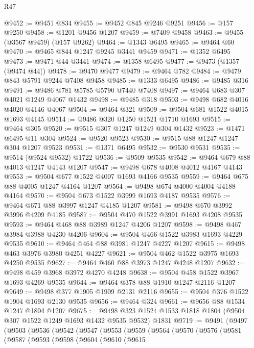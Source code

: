 \begin{lexlean}{R47}
\begin{coremodule}
@9452 := @9451 @834
@9455 := @9452 @845 @9246 @9251
@9456 := @157 @9250
@9458 := @1201 @9456 @1207
@9459 := @7409 @9458
@9463 := @9455 (@3567 @9459) (@157 @9262)
@9464 := @1343 @6495
@9465 := @9464 @60
@9470 := @9465 @844 @1247 @9245 @3441 @9459
@9471 := @1352 @6495
@9473 := @9471 @44 @3441
@9474 := @1358 @6495
@9477 := @9473 (@1357 (@9474 @44))
@9478 := @9470 @9477
@9479 := @9464 @782
@9484 := @9479 @843 @5791 @9244 @7408 @9458
@9485 := @1333 @6495
@9486 := @9485 @316
@9491 := @9486 @781 @5785 @5790 @7440 @7408
@9497 := @9464 @683 @307 @4021 @1249 @4067 @1432
@9498 := @9485 @318
@9503 := @9498 @682 @4016 @4020 @4146 @4067
@9504 := @9464 @321
@9509 := @9504 @681 @1522 @4015 @1693 @4145
@9514 := @9486 @320 @1250 @1521 @1710 @1693
@9515 := @9464 @305
@9520 := @9515 @307 @1247 @1249 @304 @1432
@9523 := @1471 @6495 @11 @304
@9524 := @9520 @9523
@9530 := @9515 @88 @1247 @1247 @304 @1207 @9523
@9531 := @1371 @6495
@9532 := @9530 @9531
@9535 := @9514 (@9524 @9532) @1722
@9536 := @9509 @9535
@9542 := @9464 @679 @88 @4013 @1247 @4143 @1207
@9547 := @9498 @678 @4008 @4012 @4167 @4143
@9553 := @9504 @677 @1522 @4007 @1693 @4166 @9535
@9559 := @9464 @675 @88 @4005 @1247 @4164 @1207
@9564 := @9498 @674 @4000 @4004 @4188 @4164
@9570 := @9504 @673 @1522 @3999 @1693 @4187 @9535
@9576 := @9464 @671 @88 @3997 @1247 @4185 @1207
@9581 := @9498 @670 @3992 @3996 @4209 @4185
@9587 := @9504 @470 @1522 @3991 @1693 @4208 @9535
@9593 := @9464 @468 @88 @3989 @1247 @4206 @1207
@9598 := @9498 @467 @3984 @3988 @4230 @4206
@9604 := @9504 @466 @1522 @3983 @1693 @4229 @9535
@9610 := @9464 @464 @88 @3981 @1247 @4227 @1207
@9615 := @9498 @463 @3976 @3980 @4251 @4227
@9621 := @9504 @462 @1522 @3975 @1693 @4250 @9535
@9627 := @9464 @460 @88 @3973 @1247 @4248 @1207
@9632 := @9498 @459 @3968 @3972 @4270 @4248
@9638 := @9504 @458 @1522 @3967 @1693 @4269 @9535
@9644 := @9464 @378 @88 @1910 @1247 @2116 @1207
@9649 := @9498 @377 @1905 @1909 @2131 @2116
@9655 := @9504 @376 @1522 @1904 @1693 @2130 @9535
@9656 := @9464 @324
@9661 := @9656 @88 @1534 @1247 @1804 @1207
@9675 := @9498 @323 @1524 @1533 @1818 @1804 (@9504 @307 @1522 @1249 @1693 @1432 @9535 @9532) @1831
@9719 := @9491
    (@9497
      (@9503
        (@9536
          (@9542
            (@9547
              (@9553
                (@9559
                  (@9564
                    (@9570
                      (@9576
                        (@9581
                          (@9587
                            (@9593
                              (@9598
                                (@9604
                                  (@9610
                                    (@9615

\end{coremodule}
\end{lexlean}
